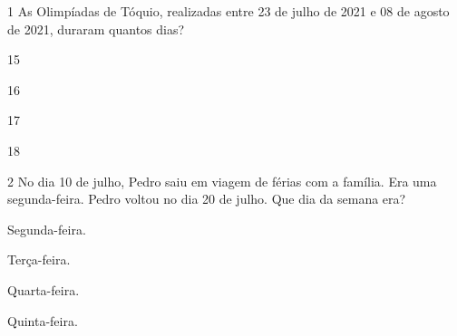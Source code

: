 






\pagebreak
{}

\num{1} As Olimpíadas de Tóquio, realizadas entre 23 de julho de 2021 e 08 de
agosto de 2021, duraram quantos dias?

\begin{escolha}
\item 15

\item 16

\item 17

\item 18
\end{escolha}

\num{2} No dia 10 de julho, Pedro saiu em viagem de férias com a família. Era
uma segunda-feira. Pedro voltou no dia 20 de julho. Que dia da semana
era?

\begin{escolha}
\item Segunda-feira.

\item Terça-feira.

\item Quarta-feira.

\item Quinta-feira.
\end{escolha}

